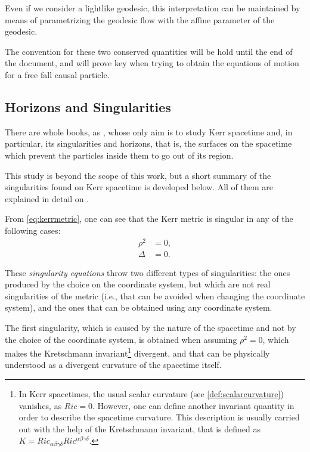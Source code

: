 Even if we consider a lightlike geodesic, this interpretation can be maintained by means of parametrizing the geodesic flow with the affine parameter of the geodesic.

The convention for these two conserved quantities will be hold until the end of the document, and will prove key when trying to obtain the equations of motion for a free fall causal particle.


\subsection{Horizons and Singularities}

There are whole books, as \cite{oneill95}, whose only aim is to study Kerr spacetime and, in particular, its singularities and horizons, that is, the surfaces on the spacetime which prevent the particles inside them to go out of its region.

This study is beyond the scope of this work, but a short summary of the singularities found on Kerr spacetime is developed below. All of them are explained in detail on \cite[Sec. 2.4]{galindo14}.

From \autoref{eq:kerrmetric}, one can see that the Kerr metric is singular in any of the following cases:
\begin{align}
\rho^2 &= 0, \\
\Delta &= 0.
\end{align}

These \emph{singularity equations} throw two different types of singularities: the ones produced by the choice on the coordinate system, but which are not real singularities of the metric (i.e., that can be avoided when changing the coordinate system), and the ones that can be obtained using any coordinate system.

The first singularity, which is caused by the nature of the spacetime and not by the choice of the coordinate system, is obtained when assuming $\rho^2 = 0$, which makes the Kretschmann invariant\footnote{In Kerr spacetimes, the usual scalar curvature (see \autoref{def:scalarcurvature}) vanishes, as $Ric = 0$. However, one can define another invariant quantity in order to describe the spacetime curvature. This description is usually carried out with the help of the Kretschmann invariant, that is defined as $K = Ric_{\alpha\beta\gamma\delta}Ric^{\alpha\beta\gamma\delta}$.} divergent, and that can be physically understood as a divergent curvature of the spacetime itself.

